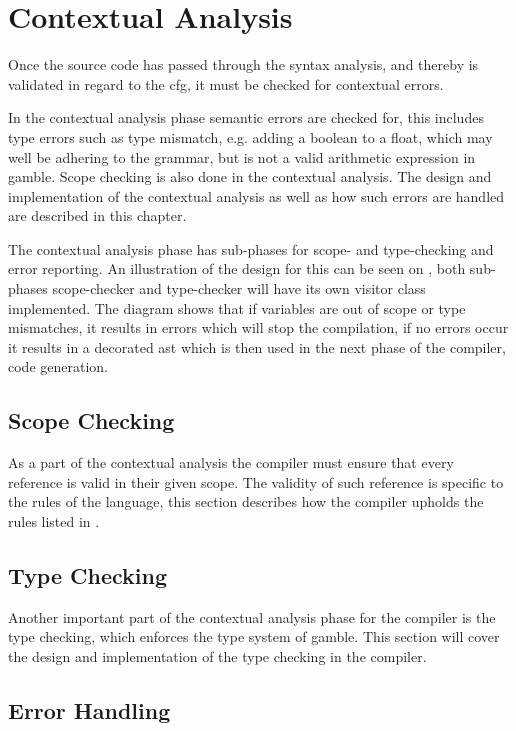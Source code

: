 \chapter{Contextual Analysis}
Once the source code has passed through the syntax analysis, and thereby is validated in regard to the \acrshort{cfg}, it must be checked for contextual errors.

In the contextual analysis phase semantic errors are checked for, this includes type errors such as type mismatch, e.g. adding a boolean to a float, which may well be adhering to the grammar, but is not a valid arithmetic expression in \gls{gamble}.
Scope checking is also done in the contextual analysis. 
The design and implementation of the contextual analysis as well as how such errors are handled are described in this chapter.

The contextual analysis phase has sub-phases for scope- and type-checking and error reporting.
An illustration of the design for this can be seen on , both sub-phases scope-checker and type-checker will have its own visitor class implemented.
The diagram shows that if variables are out of scope or type mismatches, it results in errors which will stop the compilation, if no errors occur it results in a decorated \acrshort{ast} which is then used in the next phase of the compiler, code generation.





\section{Scope Checking}
As a part of the contextual analysis the compiler must ensure that every reference is valid in their given scope.
The validity of such reference is specific to the rules of the language, this section describes how the compiler upholds the rules listed in .


\section{Type Checking}
Another important part of the contextual analysis phase for the compiler is the type checking, which enforces the type system of \gls{gamble}.
This section will cover the design and implementation of the type checking in the compiler.


\section{Error Handling}
